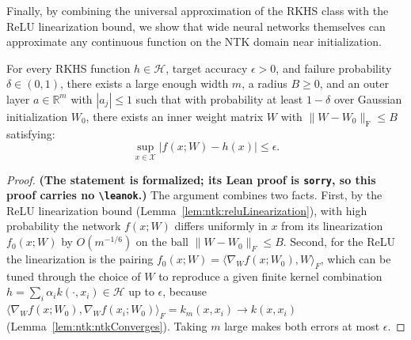 Finally, by combining the universal approximation of the RKHS class with the ReLU linearization bound, we show that wide neural networks themselves can approximate any continuous function on the NTK domain near initialization.

\begin{theorem}\label{thm:ntk:networkApprox}
  \leanok
For every RKHS function $h \in \mathcal{H}$, target accuracy $\epsilon > 0$, and failure probability $\delta \in (0, 1)$, there exists a large enough width $m$, a radius $B \ge 0$, and an outer layer $a \in \mathbb{R}^m$ with $|a_j| \le 1$ such that with probability at least $1-\delta$ over Gaussian initialization $W_0$, there exists an inner weight matrix $W$ with $\|W-W_0\|_{\mathrm{F}} \le B$ satisfying:
\[
  \sup_{x \in \mathcal{X}} |f(x; W) - h(x)| \le \epsilon.
\]
\end{theorem}

\begin{proof}
\textbf{(The statement is formalized; its Lean proof is \texttt{sorry}, so this proof carries no \texttt{\textbackslash leanok}.)}
The argument combines two facts. First, by the ReLU linearization bound (Lemma~\ref{lem:ntk:reluLinearization}), with high probability the network $f(x;W)$ differs uniformly in $x$ from its linearization $f_0(x;W)$ by $O(m^{-1/6})$ on the ball $\|W-W_0\|_F\le B$. Second, for the ReLU the linearization is the pairing $f_0(x;W)=\langle\nabla_Wf(x;W_0),W\rangle_F$, which can be tuned through the choice of $W$ to reproduce a given finite kernel combination $h=\sum_i\alpha_ik(\cdot,x_i)\in\mathcal H$ up to $\epsilon$, because $\langle\nabla_Wf(x;W_0),\nabla_Wf(x_i;W_0)\rangle_F=k_m(x,x_i)\to k(x,x_i)$ (Lemma~\ref{lem:ntk:ntkConverges}). Taking $m$ large makes both errors at most $\epsilon$.
\end{proof}
